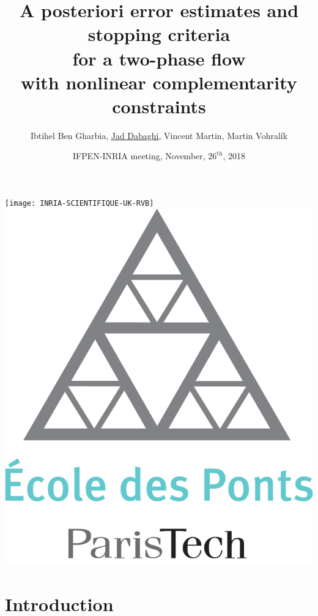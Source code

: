 \documentclass[10 pt]{beamer}
\title[Interpore 2018]{A posteriori error estimates and stopping criteria\\ for a two-phase flow\\ with nonlinear complementarity constraints}
\author[Jad Dabaghi]
{Ibtihel Ben Gharbia, \underline{Jad Dabaghi}, Vincent Martin, Martin Vohral\'ik}
\institute[]{Inria Paris \& Université Paris-Est}
\date{IFPEN-INRIA meeting,  November, $26^{\mathrm{th}}$, 2018}
\begin{document}
\begin{frame}
\maketitle
\texttt{[image: INRIA-SCIENTIFIQUE-UK-RVB]}
\hfill \includegraphics[scale=0.08]{Logo_ponts_paristech}

\end{frame}




\newcommand{\kk}{\textcolor{royalblue}{k}}
\newcommand{\ii}{\textcolor{burntorange}{i}}
\newcommand{\nuu}{\textcolor{burntorange}{\nu}}


\setcounter{tocdepth}{4}
\section{Introduction}
\end{document}
